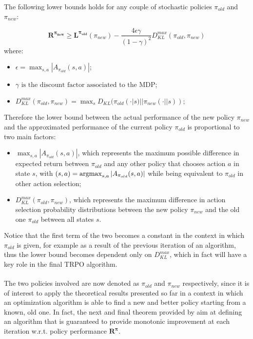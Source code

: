                 \begin{theorem}
                    \label{th:trpo_dklbound}
                    The following lower bounds holds for any couple of stochastic policies $\pi_{old}$ and $\pi_{new}$:
                    
                    \[ \mathbf{R^{\pi_{new}}} \geq \mathbf{L^{\pi_{old}}}(\pi_{new}) - \frac{4 \epsilon \gamma}{\left( 1 - \gamma \right)^2} D_{KL}^{max}(\pi_{old}, \pi_{new})\]
                    where:
                    \begin{itemize}
                        \item $\epsilon = \max_{s, a} | A_{\pi_{old}}(s, a) |$;
                        \item $\gamma \text{ is the discount factor associated to the MDP}$;
                        \item $D_{KL}^{max}(\pi_{old}, \pi_{new}) = \max_{s} D_{KL} (\pi_{old}(\cdot | s) || \pi_{new} (\cdot||s))$;
                    \end{itemize}
                \end{theorem}
                \noindent
                Therefore the lower bound between the actual performance of the new policy $\pi_{new}$ and the approximated performance of the current policy $\pi_{old}$ is proportional to two main factors:
                
                \begin{itemize}
                    \item $\max_{s, a} | A_{\pi_{old}}(s, a) |$, which represents the maximum possible difference in expected return between $\pi_{old}$ and any other policy that chooses action $a$ in state $s$, with $(s,a) = \operatorname*{argmax}_{s,a} | A_{\pi_{old}}(s, a) |$ while being equivalent to $\pi_{old}$ in other action selection;
                    \item $D_{KL}^{max}(\pi_{old}, \pi_{new})$, which represents the maximum difference in action selection probability distributions between the new policy $\pi_{new}$ and the old one $\pi_{old}$ between all states $s$.
                \end{itemize}
                \noindent
                Notice that the first term of the two becomes a constant in the context in which $\pi_{old}$ is given, for example as a result of the previous iteration of an algorithm, thus the lower bound becomes dependent only on $D_{KL}^{max}$, which in fact will have a key role in the final TRPO algorithm.
                \\\\
                The two policies involved are now denoted as $\pi_{old}$ and $\pi_{new}$ respectively, since it is of interest to apply the theoretical results presented so far in a context in which an optimization algorithm is able to find a new and better policy starting from a known, old one. In fact, the next and final theorem provided by  aim at defining an algorithm that is guaranteed to provide monotonic improvement at each iteration w.r.t. policy performance $\mathbf{R^{\pi}}$.
                
